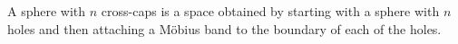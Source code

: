 A sphere with $n$ cross-caps is a space obtained by starting with a sphere with $n$ holes and then attaching a Möbius band to the boundary of each of the holes.
